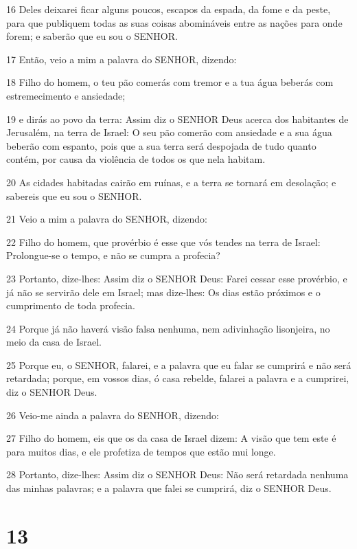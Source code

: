 \par 16 Deles deixarei ficar alguns poucos, escapos da espada, da fome e da peste, para que publiquem todas as suas coisas abomináveis entre as nações para onde forem; e saberão que eu sou o SENHOR.
\par 17 Então, veio a mim a palavra do SENHOR, dizendo:
\par 18 Filho do homem, o teu pão comerás com tremor e a tua água beberás com estremecimento e ansiedade;
\par 19 e dirás ao povo da terra: Assim diz o SENHOR Deus acerca dos habitantes de Jerusalém, na terra de Israel: O seu pão comerão com ansiedade e a sua água beberão com espanto, pois que a sua terra será despojada de tudo quanto contém, por causa da violência de todos os que nela habitam.
\par 20 As cidades habitadas cairão em ruínas, e a terra se tornará em desolação; e sabereis que eu sou o SENHOR.
\par 21 Veio a mim a palavra do SENHOR, dizendo:
\par 22 Filho do homem, que provérbio é esse que vós tendes na terra de Israel: Prolongue-se o tempo, e não se cumpra a profecia?
\par 23 Portanto, dize-lhes: Assim diz o SENHOR Deus: Farei cessar esse provérbio, e já não se servirão dele em Israel; mas dize-lhes: Os dias estão próximos e o cumprimento de toda profecia.
\par 24 Porque já não haverá visão falsa nenhuma, nem adivinhação lisonjeira, no meio da casa de Israel.
\par 25 Porque eu, o SENHOR, falarei, e a palavra que eu falar se cumprirá e não será retardada; porque, em vossos dias, ó casa rebelde, falarei a palavra e a cumprirei, diz o SENHOR Deus.
\par 26 Veio-me ainda a palavra do SENHOR, dizendo:
\par 27 Filho do homem, eis que os da casa de Israel dizem: A visão que tem este é para muitos dias, e ele profetiza de tempos que estão mui longe.
\par 28 Portanto, dize-lhes: Assim diz o SENHOR Deus: Não será retardada nenhuma das minhas palavras; e a palavra que falei se cumprirá, diz o SENHOR Deus.

\chapter{13}

